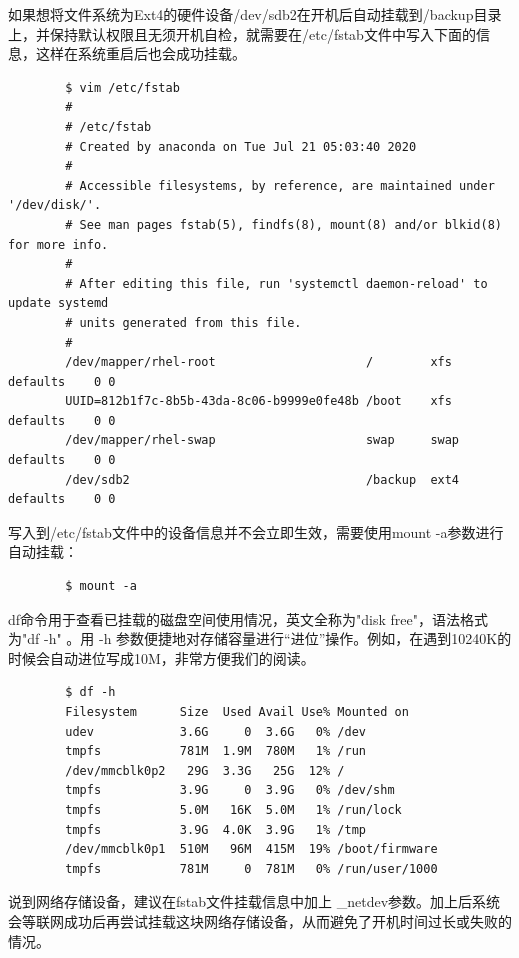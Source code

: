\documentclass[UTF8]{article}
\begin{document}
	如果想将文件系统为Ext4的硬件设备/dev/sdb2在开机后自动挂载到/backup目录上，并保持默认权限且无须开机自检，就需要在/etc/fstab文件中写入下面的信息，这样在系统重启后也会成功挂载。
	
	\begin{lstlisting}
		$ vim /etc/fstab
		#
		# /etc/fstab
		# Created by anaconda on Tue Jul 21 05:03:40 2020
		#
		# Accessible filesystems, by reference, are maintained under '/dev/disk/'.
		# See man pages fstab(5), findfs(8), mount(8) and/or blkid(8) for more info.
		#
		# After editing this file, run 'systemctl daemon-reload' to update systemd
		# units generated from this file.
		#
		/dev/mapper/rhel-root                     /        xfs     defaults    0 0
		UUID=812b1f7c-8b5b-43da-8c06-b9999e0fe48b /boot    xfs     defaults    0 0
		/dev/mapper/rhel-swap                     swap     swap    defaults    0 0
		/dev/sdb2                                 /backup  ext4    defaults    0 0
	\end{lstlisting}
	
	写入到/etc/fstab文件中的设备信息并不会立即生效，需要使用mount -a参数进行自动挂载：
	
	\begin{lstlisting}
		$ mount -a
	\end{lstlisting}
	
	df命令用于查看已挂载的磁盘空间使用情况，英文全称为"disk free"，语法格式为"df -h" 。用 -h 参数便捷地对存储容量进行“进位”操作。例如，在遇到10240K的时候会自动进位写成10M，非常方便我们的阅读。
	
	\begin{lstlisting}
		$ df -h
		Filesystem      Size  Used Avail Use% Mounted on
		udev            3.6G     0  3.6G   0% /dev
		tmpfs           781M  1.9M  780M   1% /run
		/dev/mmcblk0p2   29G  3.3G   25G  12% /
		tmpfs           3.9G     0  3.9G   0% /dev/shm
		tmpfs           5.0M   16K  5.0M   1% /run/lock
		tmpfs           3.9G  4.0K  3.9G   1% /tmp
		/dev/mmcblk0p1  510M   96M  415M  19% /boot/firmware
		tmpfs           781M     0  781M   0% /run/user/1000	
	\end{lstlisting}
	
	
	
	说到网络存储设备，建议在fstab文件挂载信息中加上 \_netdev参数。加上后系统会等联网成功后再尝试挂载这块网络存储设备，从而避免了开机时间过长或失败的情况。
	
\end{document}
